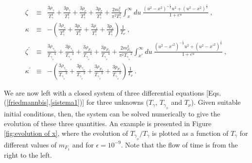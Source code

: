 \documentclass[12pt]{article}
\begin{document}
\begin{eqnarray}
\zeta & \equiv &  \frac{3\rho _{\gamma}}{T _{\gamma} ^4} + \frac{3p _{\gamma}}{T _{\gamma} ^4} + \frac{3\rho _e}{T _{\gamma} ^4} + \frac{3p _e}{T _{\gamma} ^4} + \frac{2m _{e} ^2}{\pi ^2 T _{\gamma} ^2} \int _{x} ^{\infty} du \ \frac{(u^2 - x^2)^{-\frac{1}{2}} u^2 + (u^2 - x^2)^{\frac{1}{2}}}{1 + e^u} \ , \nonumber \\
\kappa & \equiv & - \left ( \frac{3\rho _{\gamma}}{T _{\gamma} ^3} + \frac{3p _{\gamma}}{T _{\gamma} ^3} + \frac{3\rho _e}{T _{\gamma} ^3} + \frac{3p _e}{T _{\gamma} ^3} \right ) \frac{1}{T _{\nu}} \ , \nonumber \\
\zeta ^{'} & \equiv & \frac{3\rho _{\gamma _{_D}}}{{T _{\gamma _{_D}}} ^4} + \frac{3p _{\gamma _{_D}}}{{T _{\gamma _{_D}}}^4} + \frac{3\rho _{F_1}}{{T _{\gamma _{_D}}} ^4} + \frac{3p _{F_1}}{{T _{\gamma _{_D}}} ^4} + \frac{2m _{F_1} ^2}{\pi ^2 {T _{\gamma _{_D}}} ^2} \int _{x'} ^{\infty} du \ \frac{(u^2 - {x'}^2)^{-\frac{1}{2}} u^2 + (u^2 - {x'}^2)^{\frac{1}{2}}}{1 + e^u} \ , \nonumber \\
\kappa ^{'} & \equiv & - \left ( \frac{3\rho _{\gamma _{_D}}}{{T _{\gamma _{_D}}}^3} + \frac{3p _{\gamma _{_D}}}{{T _{\gamma _{_D}}} ^3} + \frac{3\rho _{F_1}}{{T _{\gamma _{_D}}} ^3} + \frac{3p _{F_1}}{{T _{\gamma _{_D}}} ^3} \right ) \frac{1}{T _{\nu}} \ .
\label{sistemo}
\end{eqnarray}
%

We are now left with a closed system of three differential equations [Eqs.(\ref{friedmannbis},\ref{sistema1})] for three unknowns ($T _{\gamma}$, $T _{\gamma _{_D}}$ and $T _{\nu}$). Given suitable initial conditions, then, the system can be solved numerically to give the evolution of these three quantities. An example is presented in Figure \ref{fig:evolution of x}, where the evolution of $T _{\gamma _{_D}}/T _{\gamma}$ is plotted as a function of $T _{\gamma}$ for different values of $m _{F_1}$ and for $\epsilon = 10 ^{-9}$. Note that the flow of time is from the right to the left.
\end{document}
